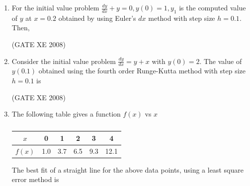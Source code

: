 \documentclass[12pt]{article}
\begin{document}
\begin{enumerate}
(GATE XE 2008)
\item  For the initial value problem\newline
$\frac{dy}{dx}+y=0 , y(0)=1 , y_{1}$  is the computed value of $y$ at $x = 0.2$ obtained by using Euler's $dx$ method with step size $h =0.1$. Then,

\begin{enumerate}
\end{enumerate}

(GATE XE 2008)
\item Consider the initial value problem\newline
$\frac{dy}{dx}=y+x$ with $y(0)=2$.\newline
The value of $y(0.1)$ obtained using the fourth order Runge-Kutta method with step size $h = 0.1$ is

\begin{enumerate}
\end{enumerate}

(GATE XE 2008)
\item The following table gives a function $f(x)$ vs $x$\newline
\begin{table}[H]     \centering     \caption{}     \label{}     \begin{tabular}{|c|c|c|c|c|c|}
\hline
    $x$ & 0 & 1 & 2 & 3 & 4 \\
    \hline
    $f(x)$ & 1.0 & 3.7 & 6.5 & 9.3 & 12.1\\
    \hline
\end{tabular} \end{table}
The best fit of a straight line for the above data points, using a least square error method is

\begin{enumerate}
\end{enumerate}


\end{enumerate}
\end{document}
